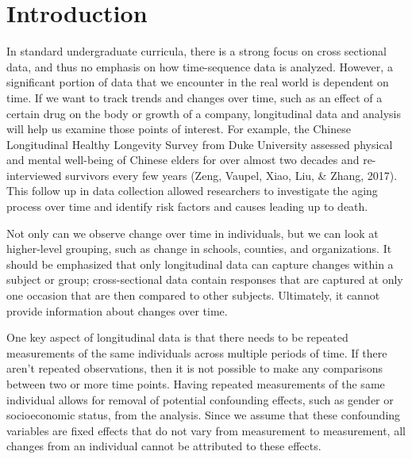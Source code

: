 \documentclass[12pt, twoside]{amherstthesis}
\begin{document}
  \listoftables

  \listoffigures


\mainmatter %
\pagestyle{fancyplain} %

\hypertarget{intro}{%
\chapter{Introduction}\label{intro}}

In standard undergraduate curricula, there is a strong focus on cross sectional data, and thus no emphasis on how time-sequence data is analyzed. However, a significant portion of data that we encounter in the real world is dependent on time. If we want to track trends and changes over time, such as an effect of a certain drug on the body or growth of a company, longitudinal data and analysis will help us examine those points of interest. For example, the Chinese Longitudinal Healthy Longevity Survey from Duke University assessed physical and mental well-being of Chinese elders for over almost two decades and re-interviewed survivors every few years (Zeng, Vaupel, Xiao, Liu, \& Zhang, 2017). This follow up in data collection allowed researchers to investigate the aging process over time and identify risk factors and causes leading up to death.

Not only can we observe change over time in individuals, but we can look at higher-level grouping, such as change in schools, counties, and organizations. It should be emphasized that only longitudinal data can capture changes within a subject or group; cross-sectional data contain responses that are captured at only one occasion that are then compared to other subjects. Ultimately, it cannot provide information about changes over time.

One key aspect of longitudinal data is that there needs to be repeated measurements of the same individuals across multiple periods of time. If there aren't repeated observations, then it is not possible to make any comparisons between two or more time points. Having repeated measurements of the same individual allows for removal of potential confounding effects, such as gender or socioeconomic status, from the analysis. Since we assume that these confounding variables are fixed effects that do not vary from measurement to measurement, all changes from an individual cannot be attributed to these effects.
\end{document}
